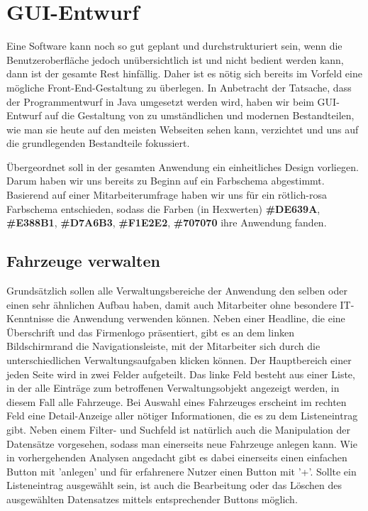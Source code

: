 \chapter{GUI-Entwurf}
\label{chapter:gui}

Eine Software kann noch so gut geplant und durchstrukturiert sein, wenn die Benutzeroberfläche jedoch unübersichtlich ist und nicht bedient werden kann, dann ist der gesamte Rest hinfällig. Daher ist es nötig sich bereits im Vorfeld eine mögliche Front-End-Gestaltung zu überlegen. In Anbetracht der Tatsache, dass der Programmentwurf in Java umgesetzt werden wird, haben wir beim GUI-Entwurf auf die Gestaltung von zu umständlichen und modernen Bestandteilen, wie man sie heute auf den meisten Webseiten sehen kann, verzichtet und uns auf die grundlegenden Bestandteile fokussiert. 


Übergeordnet soll in der gesamten Anwendung ein einheitliches Design vorliegen. Darum haben wir uns bereits zu Beginn auf ein Farbschema abgestimmt. Basierend auf einer Mitarbeiterumfrage haben wir uns für ein rötlich-rosa Farbschema entschieden, sodass die Farben (in Hexwerten) \textbf{\#DE639A}, \textbf{\#E388B1}, \textbf{\#D7A6B3}, \textbf{\#F1E2E2}, \textbf{\#707070} ihre Anwendung fanden. 

\section{Fahrzeuge verwalten}

Grundsätzlich sollen alle Verwaltungsbereiche der Anwendung den selben oder einen sehr ähnlichen Aufbau haben, damit auch Mitarbeiter ohne besondere IT-Kenntnisse die Anwendung verwenden können. Neben einer Headline, die eine Überschrift und das Firmenlogo präsentiert, gibt es an dem linken Bildschirmrand die Navigationsleiste, mit der Mitarbeiter sich durch die unterschiedlichen Verwaltungsaufgaben klicken können. Der Hauptbereich einer jeden Seite wird in zwei Felder aufgeteilt. Das linke Feld besteht aus einer Liste, in der alle Einträge zum betroffenen Verwaltungsobjekt angezeigt werden, in diesem Fall alle Fahrzeuge. Bei Auswahl eines Fahrzeuges erscheint im rechten Feld eine Detail-Anzeige aller nötiger Informationen, die es zu dem Listeneintrag gibt. Neben einem Filter- und Suchfeld ist natürlich auch die Manipulation der Datensätze vorgesehen, sodass man einerseits neue Fahrzeuge anlegen kann. Wie in vorhergehenden Analysen angedacht gibt es dabei einerseits einen einfachen Button mit 'anlegen' und für erfahrenere Nutzer einen Button mit '+'. Sollte ein Listeneintrag ausgewählt sein, ist auch die Bearbeitung oder das Löschen des ausgewählten Datensatzes mittels entsprechender Buttons möglich. 

